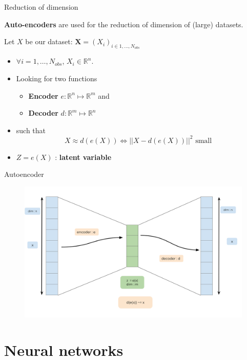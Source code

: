 \documentclass[compress,10pt]{beamer}
\begin{document}
\begin{frame}{Reduction of dimension}

\textbf{Auto-encoders} are used for the reduction of dimension of
(large) datasets.

Let \(X\) be our dataset:
\(\mathbf{X}=(X_i)_{i \in 1, \dots,N_{obs}}\)

\begin{itemize}
\item
  \(\forall i =1,\dots,N_{obs}\), \(X_i \in \mathbb{R}^n\).
\item
  Looking for two functions
  \begin{itemize}
\item
  \textbf{Encoder} \(e :\mathbb{R}^n \mapsto \mathbb{R}^m\) and
\item
  \textbf{Decoder} \(d :\mathbb{R}^m \mapsto \mathbb{R}^n\)
\end{itemize}
  \item
  such that
  \[X \approx d(e(X)) \Leftrightarrow ||X -   d(e(X)) ||^2 \mbox{ small } \]
\item
  \(Z = e(X)\) : \textbf{latent variable}
\end{itemize}
\end{frame}





\begin{frame}{Autoencoder}
\begin{figure}

{\centering \includegraphics[width=0.9\linewidth]{images/Autoencoder} 

}
\end{figure}
\end{frame}

\section{Neural networks}
\end{document}
